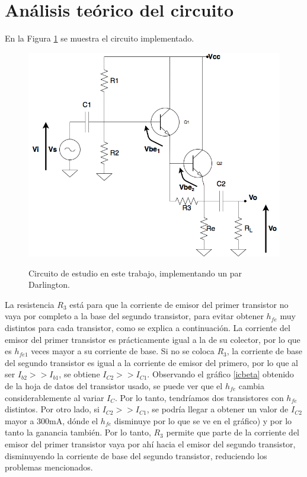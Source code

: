 
\section{Análisis teórico del circuito}
	En la Figura \ref{darlington_tp} se muestra el circuito implementado. 

\begin{figure}[H]
	\centering
		\includegraphics[scale=0.4]{./Imagenes/darlington_tp.png} \\
	\caption{Circuito de estudio en este trabajo, implementando un par Darlington.}
	\label{darlington_tp}
\end{figure}

La resistencia $R_3$ est\'a para que la corriente de emisor del primer transistor no vaya por completo a la base del segundo transistor, para evitar obtener $h_{fe}$ muy distintos para cada transistor, como se explica a continuaci\'on. La corriente del emisor del primer transistor es pr\'acticamente igual a la de su colector, por lo que es $h_{fe1}$ veces mayor a su corriente de base. Si no se coloca $R_3$, la corriente de base del segundo transistor es igual a la corriente de emisor del primero, por lo que al ser $I_{b2} >> I_{b1}$, se obtiene $I_{C2}>>I_{C1}$. Observando el gr\'afico \ref{icbeta} obtenido de la hoja de datos del transistor usado, se puede ver que el $h_{fe}$ cambia considerablemente al variar $I_C$. Por lo tanto, tendr\'iamos dos transistores con $h_{fe}$ distintos. Por otro lado, si $I_{C2} >> I_{C1}$, se podr\'ia llegar a obtener un valor de $I_{C2}$ mayor a 300mA, d\'onde el $h_{fe}$ disminuye por lo que se ve en el gr\'afico) y por lo tanto la ganancia tambi\'en. Por lo tanto, $R_3$ permite que parte de la corriente del emisor del primer transistor vaya por ah\'i hacia el emisor del segundo transistor, disminuyendo la corriente de base del segundo transistor, reduciendo los problemas mencionados.

